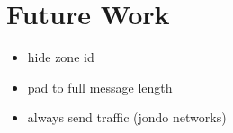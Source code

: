 \section{Future Work}
\label{sfuture}

\begin{itemize}
    \item hide zone id
    \item pad to full message length
    \item always send traffic (jondo networks)
\end{itemize}
 